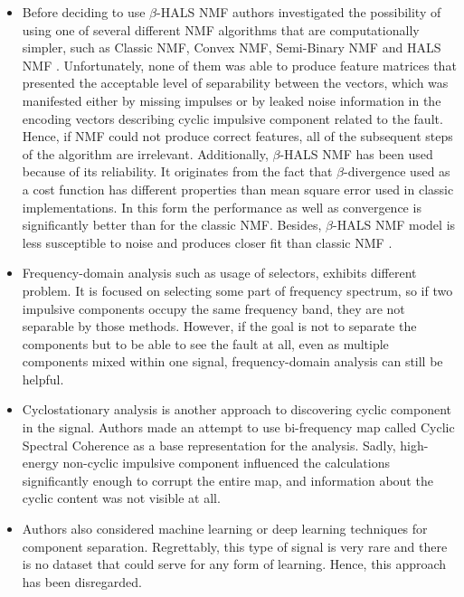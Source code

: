 \documentclass[3p,times]{elsarticle}
\begin{document}
\begin{itemize}
    \item Before deciding to use $\beta$-HALS NMF authors investigated the possibility of using one of several different NMF algorithms that are computationally simpler, such as Classic NMF, Convex NMF, Semi-Binary NMF and HALS NMF \cite{cichocki2009nonnegative}. Unfortunately, none of them was able to produce feature matrices that presented the acceptable level of separability between the vectors, which was manifested either by missing impulses or by leaked noise information in the encoding vectors describing cyclic impulsive component related to the fault. Hence, if NMF could not produce correct features, all of the subsequent steps of the algorithm are irrelevant. Additionally, $\beta$-HALS NMF has been used because of its reliability. It originates from the fact that $\beta$-divergence used as a cost function has different properties than mean square error used in classic implementations. In this form the performance as well as convergence is significantly better than for the classic NMF. Besides, $\beta$-HALS NMF model is less susceptible to noise and produces closer fit than classic NMF \cite{cichocki2008flexible}. 
    \item Frequency-domain analysis such as usage of selectors, exhibits different problem. It is focused on selecting some part of frequency spectrum, so if two impulsive components occupy the same frequency band, they are not separable by those methods. However, if the goal is not to separate the components but to be able to see the fault at all, even as multiple components mixed within one signal, frequency-domain analysis can still be helpful.
    \item Cyclostationary analysis is another approach to discovering cyclic component in the signal. Authors made an attempt to use bi-frequency map called Cyclic Spectral Coherence as a base representation for the analysis. Sadly, high-energy non-cyclic impulsive component influenced the calculations significantly enough to corrupt the entire map, and information about the cyclic content was not visible at all.
    \item Authors also considered machine learning or deep learning techniques for component separation. Regrettably, this type of signal is very rare and there is no dataset that could serve for any form of learning. Hence, this approach has been disregarded.
\end{itemize}
\end{document}
